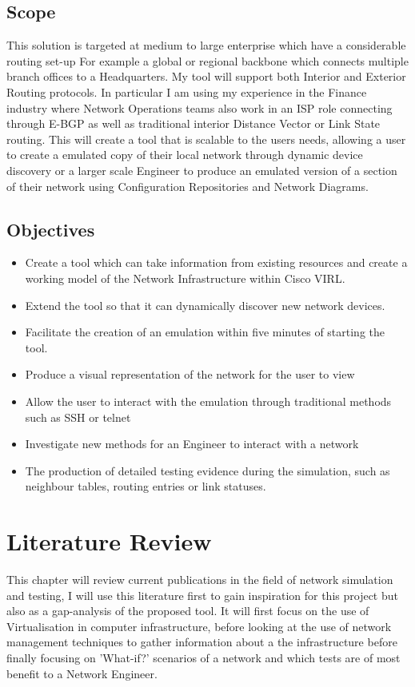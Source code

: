 \documentclass[11pt]{report}
\begin{document}
\section{Scope}

This solution is targeted at medium to large enterprise which have a considerable routing set-up For example a global or regional backbone which connects multiple branch offices to a Headquarters. My tool will support both Interior and Exterior Routing protocols. In particular I am using my experience in the Finance industry where Network Operations teams also work in an ISP role connecting through E-BGP as well as traditional interior Distance Vector or Link State routing. This will create a tool that is scalable to the users needs, allowing a user to create a emulated copy of their local network through dynamic device discovery or a larger scale Engineer to produce an emulated version of a section of their network using Configuration Repositories and Network Diagrams.

\section{Objectives}
\begin{itemize}
\item{Create a tool which can take information from existing resources and create a working model of the Network Infrastructure within Cisco VIRL.}
\item{Extend the tool so that it can dynamically discover new network devices.}
\item{Facilitate the creation of an emulation within five minutes of starting the tool.}
\item{Produce a visual representation of the network for the user to view}
\item{Allow the user to interact with the emulation through traditional methods such as SSH or telnet}
\item{Investigate new methods for an Engineer to interact with a network}
\item{The production of detailed testing evidence during the simulation, such as neighbour tables, routing entries or link statuses.}
\end{itemize}

\chapter{Literature Review}

This chapter will review current publications in the field of network simulation and testing, I will use this literature first to gain inspiration for this project but also as a gap-analysis of the proposed tool. It will first focus on the use of Virtualisation in computer infrastructure, before looking at the use of network management techniques to gather information about a the infrastructure before finally focusing on 'What-if?' scenarios of a network and which tests are of most benefit to a Network Engineer.
\end{document}
